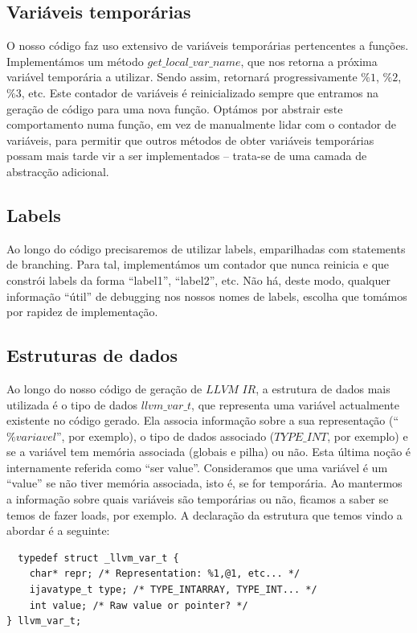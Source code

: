 \documentclass[11pt,a4paper]{article}
\begin{document}
\subsection{Variáveis temporárias}

O nosso código faz uso extensivo de variáveis temporárias pertencentes a funções. Implementámos um método $get\_local\_var\_name$, que nos retorna a próxima variável temporária a utilizar. Sendo assim, retornará progressivamente $\%1$, $\%2$, $\%3$, etc. Este contador de variáveis é reinicializado sempre que entramos na geração de código para uma nova função. Optámos por abstrair este comportamento numa função, em vez de manualmente lidar com o contador de variáveis, para permitir que outros métodos de obter variáveis temporárias possam mais tarde vir a ser implementados -- trata-se de uma camada de abstracção adicional.

\subsection{Labels}
Ao longo do código precisaremos de utilizar labels, emparilhadas com statements de branching. Para tal, implementámos um contador que nunca reinicia e que constrói labels da forma ``label1'', ``label2'', etc. Não há, deste modo, qualquer informação ``útil'' de debugging nos nossos nomes de labels, escolha que tomámos por rapidez de implementação.

\subsection{Estruturas de dados}

Ao longo do nosso código de geração de $LLVM$ $IR$, a estrutura de dados mais utilizada é o tipo de dados $llvm\_var\_t$, que representa uma variável actualmente existente no código gerado. Ela associa informação sobre a sua representação (``$\%variavel$'', por exemplo), o tipo de dados associado ($TYPE\_INT$, por exemplo) e se a variável tem memória associada (globais e pilha) ou não. Esta última noção é internamente referida como ``ser value''. Consideramos que uma variável é um ``value'' se não tiver memória associada, isto é, se for temporária. Ao mantermos a informação sobre quais variáveis são temporárias ou não, ficamos a saber se temos de fazer loads, por exemplo. A declaração da estrutura que temos vindo a abordar é a seguinte:

\begin{lstlisting}
  typedef struct _llvm_var_t {
    char* repr; /* Representation: %1,@1, etc... */
    ijavatype_t type; /* TYPE_INTARRAY, TYPE_INT... */
    int value; /* Raw value or pointer? */
} llvm_var_t;
\end{lstlisting}
\end{document}

